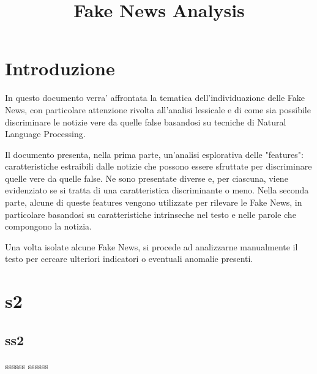 \documentclass{article}
\title{Fake News Analysis}			%
\begin{document}
	\maketitle						%
	
    
    \newpage						%
    \begin{multicols}{2}			%
    	\section{Introduzione}
	    	In questo documento verra' affrontata la tematica dell'individuazione delle Fake News, con particolare attenzione rivolta all'analisi lessicale e di come sia possibile discriminare le notizie vere da quelle false basandosi su tecniche di Natural Language Processing.
	    	
	    	Il documento presenta, nella prima parte, un'analisi esplorativa delle "features": caratteristiche estraibili dalle notizie che possono essere sfruttate per discriminare quelle vere da quelle false. Ne sono presentate diverse e, per ciascuna, viene evidenziato se si tratta di una caratteristica discriminante o meno.
	    	Nella seconda parte, alcune di queste features vengono utilizzate per rilevare le Fake News, in particolare basandosi su caratteristiche intrinseche nel testo e nelle parole che compongono la notizia.
	    	
	    	Una volta isolate alcune Fake News, si procede ad analizzarne manualmente il testo per cercare ulteriori indicatori o eventuali anomalie presenti.
	    \section{s2}
	    \subsection{ss2}
		    ssssss
		    ssssss
		    
   	\end{multicols}
\end{document}

